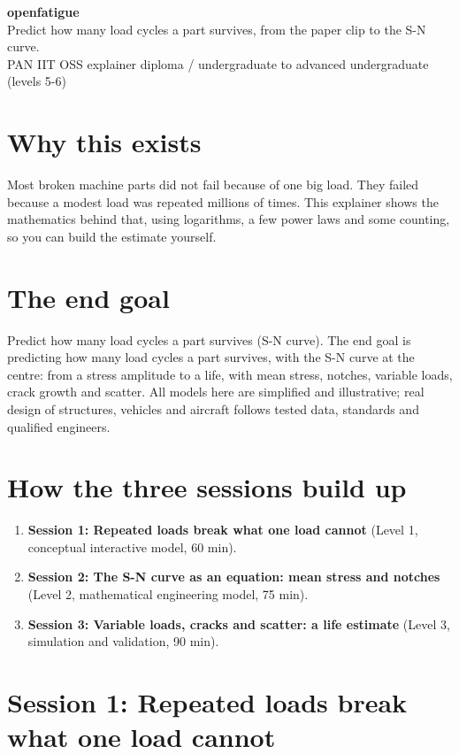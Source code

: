 \documentclass[11pt,a4paper]{article}
\begin{document}
\begin{center}{\LARGE\bfseries openfatigue}\\[0.4em]{\large Predict how many load cycles a part survives, from the paper clip to the S-N curve.}\\[0.2em]\small PAN IIT OSS explainer \textbullet{} diploma / undergraduate to advanced undergraduate (levels 5-6)\end{center}

\section*{Why this exists}
Most broken machine parts did not fail because of one big load. They failed because a modest load was repeated millions of times. This explainer shows the mathematics behind that, using logarithms, a few power laws and some counting, so you can build the estimate yourself.

\section*{The end goal}
Predict how many load cycles a part survives (S-N curve). The end goal is predicting how many load cycles a part survives, with the S-N curve at the centre: from a stress amplitude to a life, with mean stress, notches, variable loads, crack growth and scatter. All models here are simplified and illustrative; real design of structures, vehicles and aircraft follows tested data, standards and qualified engineers.

\section*{How the three sessions build up}
\begin{enumerate}[nosep]
\item \textbf{Session 1: Repeated loads break what one load cannot} (Level 1, conceptual interactive model, 60 min).
\item \textbf{Session 2: The S-N curve as an equation: mean stress and notches} (Level 2, mathematical engineering model, 75 min).
\item \textbf{Session 3: Variable loads, cracks and scatter: a life estimate} (Level 3, simulation and validation, 90 min).
\end{enumerate}

\section{Session 1: Repeated loads break what one load cannot}
\end{document}
